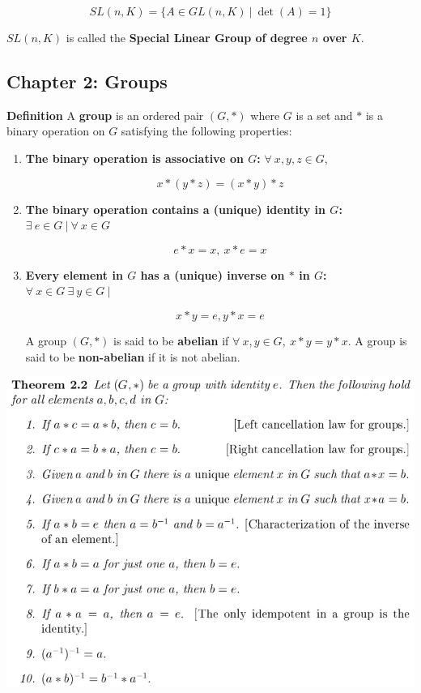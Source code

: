 \documentclass{article}
\begin{document}
\[
SL(n, K) = \{A \in GL(n, K) \ | \ \det(A) = 1\}
\]

\(SL(n, K)\) is called the \textbf{Special Linear Group of degree \(n\) over \(K\)}.

\pagebreak

\subsection{Chapter 2: Groups}

\textbf{Definition} A \textbf{group} is an ordered pair \((G, *)\) where \(G\) is a set and \(*\) is a binary operation on \(G\) satisfying the following properties:

\begin{enumerate}[1.]

\item \textbf{The binary operation is associative on \(G\):} \(\forall \ x, y , z \in G\), 

\[
x * (y * z) = (x * y) * z
\]

\item \textbf{The binary operation contains a (unique) identity in \(G\):} \(\exists \ e \in G \ | \ \forall \ x  \in  G\)

\[
e * x = x, \ x * e = x 
\]

\item \textbf{Every element in \(G\) has a (unique) inverse on \(*\) in \(G\):} \(\forall \ x \in G \ \exists \ y \in G \ |\)

\[
x*y = e, y*x =e
\]

A group \( (G, *)\) is said to be \textbf{abelian} if \(\forall \ x, y \in G, \ x*y = y*x\). A group is said to be \textbf{non-abelian} if it is not abelian.

\end{enumerate}

\includegraphics[scale=0.45]{group_properties}
\end{document}
